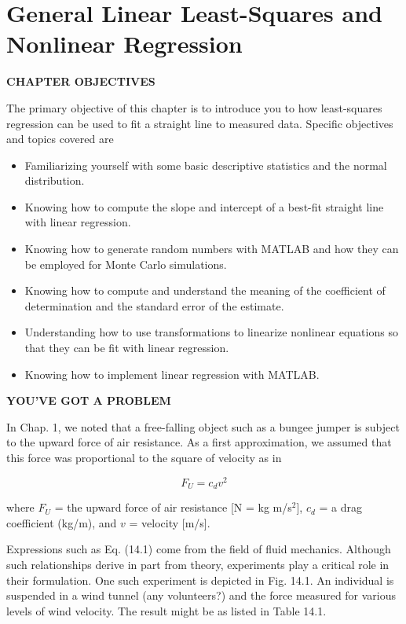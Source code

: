 \documentclass[../main.tex]{subfiles}
\begin{document}
\label{cha:cha_P_14} 
\chapter{General Linear Least-Squares and Nonlinear Regression}
\textbf{CHAPTER OBJECTIVES}

\noindent The primary objective of this chapter is to introduce you to how least-squares
regression can be used to fit a straight line to measured data. Specific objectives and
topics covered are

\begin{itemize}
	\item Familiarizing yourself with some basic descriptive statistics and the normal
	distribution.
	\item	 Knowing how to compute the slope and intercept of a best-fit straight line with
	linear regression.
	\item	 Knowing how to generate random numbers with MATLAB and how they can be
	employed for Monte Carlo simulations.
	\item	 Knowing how to compute and understand the meaning of the coefficient of
	determination and the standard error of the estimate.
	\item	 Understanding how to use transformations to linearize nonlinear equations so that
	they can be fit with linear regression.
	\item	 Knowing how to implement linear regression with MATLAB.
\end{itemize}

\noindent\textbf{YOU'VE GOT A PROBLEM}

\noindent In Chap. 1, we noted that a free-falling object such as a bungee jumper is subject to the upward force of air resistance. As a first approximation, we assumed that this force was proportional to the square of velocity as in

\begin{equation}
	\tag{14.1}
	F_U = c_d v^2
\end{equation}

\noindent where $F_U$ = the upward force of air resistance [N = kg m/s$^2$], $c_d$ = a drag coefficient
(kg/m), and $v$ = velocity [m/s].

Expressions such as Eq. (14.1) come from the field of fluid mechanics. Although such
relationships derive in part from theory, experiments play a critical role in their formulation. One such experiment is depicted in Fig. 14.1. An individual is suspended in a wind tunnel (any volunteers?) and the force measured for various levels of wind velocity. The
result might be as listed in Table 14.1.
\end{document}
